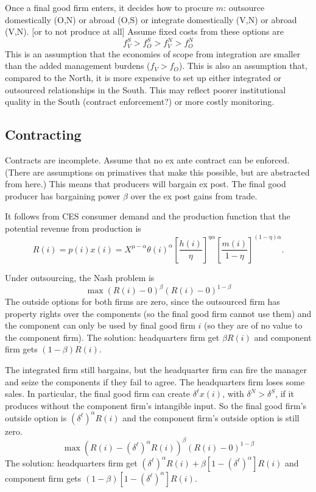 \documentclass[11pt, pdftex]{article}
\begin{document}
Once a final good firm enters, it decides how to procure $m$: outsource domestically (O,N) or abroad (O,S) or integrate domestically (V,N) or abroad (V,N). [or to not produce at all] Assume fixed costs from these options are
\begin{equation}\label{eq:fixed}
    f_V^S>f_O^S>f_V^N>f_O^N
\end{equation}
This is an assumption that the economies of scope from integration are smaller than the added management burdens ($f_V>f_O$). This is also an assumption that, compared to the North, it is more expensive to set up either integrated or outsourced relationships in the South. This may reflect poorer institutional quality in the South (contract enforcement?) or more costly monitoring.

\subsection{Contracting}
Contracts are incomplete. Assume that no ex ante contract can be enforced. (There are assumptions on primatives that make this possible, but are abstracted from here.) This means that producers will bargain ex post. The final good producer has bargaining power $\beta$ over the ex post gains from trade.

It follows from CES consumer demand and the production function that the potential revenue from production is
\begin{equation}\label{eq:rev}
    R(i)=p\left(i \right) x\left(i \right)=X^{\mu-\alpha}\theta(i)^{\alpha}\left[\frac{h(i)}{\eta }\right]^{\eta \alpha}\left[\frac{m(i)}{1-\eta}\right]^{(1-\eta)\alpha}.
\end{equation}


Under outsourcing, the Nash problem is
\begin{equation}\label{eq:nash_out}
    \max \left(R\left(i\right)-0\right)^\beta\left(R\left(i\right)-0\right)^{1-\beta}
\end{equation}
The outside options for both firms are zero, since the outsourced firm has property rights over the components (so the final good firm cannot use them) and the component can only be used by final good firm $i$ (so they are of no value to the component firm). The solution: headquarters firm get $\beta R(i)$ and component firm gets $(1-\beta) R(i)$.

The integrated firm still bargains, but the headquarter firm can fire the manager and seize the components if they fail to agree. The headquarters firm loses some sales. In particular, the final good firm can create $\delta^\ell x(i)$, with $\delta^N>\delta^S$, if it produces without the component firm's intangible input. So the final good firm's outside option is $\left(\delta^\ell\right)^{\alpha}R\left(i\right)$ and the component firm's outside option is still zero.
\begin{equation}\label{eq:nash_vert}
    \max \left(R\left(i\right)-\left(\delta^\ell\right)^{\alpha}R\left(i\right)\right)^\beta\left(R\left(i\right)-0\right)^{1-\beta}
\end{equation}
The solution: headquarters firm get $(\delta^\ell)^{\alpha}R(i)+ \beta[1-(\delta^\ell)^{\alpha}] R(i)$ and component firm gets $(1-\beta) [1-(\delta^\ell)^{\alpha}]R(i)$.
\end{document}
